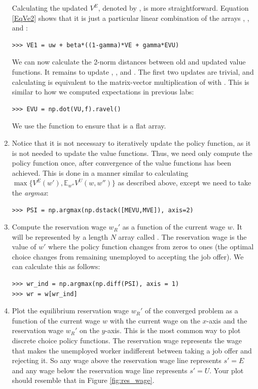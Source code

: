 \begin{problem}
\begin{enumerate}
   Calculating the updated $V^E$, denoted by , is more straightforward.
   Equation \eqref{EqVe2} shows that it is just
   a particular linear combination of the arrays , , and :
   \begin{lstlisting}
>>> VE1 = uw + beta*((1-gamma)*VE + gamma*EVU)
   \end{lstlisting}

   We can now calculate the 2-norm distances between old and updated value functions.
   It remains to update , , and .
   The first two updates are trivial, and calculating  is equivalent to the
   matrix-vector multiplication of  with . This is similar to how we computed
   expectations in previous labs:
   \begin{lstlisting}
>>> EVU = np.dot(VU,f).ravel()
   \end{lstlisting}
   We use the  function to ensure that  is a flat array.

   \item Notice that it is not necessary to iteratively update the policy function, as it is not needed
   to update the value functions. Thus, we need only compute the policy function once, after convergence
   of the value functions has been achieved. This is done in a manner similar to calculating
   $\max\{V^E(w'), \mathbb{E}_{w''}V^U(w,w'')\}$ as described above, except we need to take the \emph{argmax}:
\begin{lstlisting}
>>> PSI = np.argmax(np.dstack([MEVU,MVE]), axis=2)
\end{lstlisting}

   \item Compute the reservation wage $w_R'$ as a function of the current wage $w$. It will be represented
   by a length $N$ array called . The reservation wage is the
   value of $w'$ where the policy function changes from zeros to ones (the optimal choice changes from remaining
   unemployed to accepting the job offer). We can calculate this as follows:
   \begin{lstlisting}
>>> wr_ind = np.argmax(np.diff(PSI), axis = 1)
>>> wr = w[wr_ind]
   \end{lstlisting}

   \item Plot the equilibrium reservation wage $w_R'$ of the converged problem as a function of the current
   wage $w$ with the current wage on the $x$-axis and the reservation wage $w_R'$ on the $y$-axis. This is
   the most common way to plot discrete choice policy functions. The reservation wage represents the wage
   that makes the unemployed worker indifferent between taking a job offer and rejecting it. So any wage
   above the reservation wage line represents $s' = E$ and any wage below the reservation wage line represents
   $s' = U$. Your plot should resemble that in Figure \ref{fig:res_wage}.

\end{enumerate}
\end{problem}

